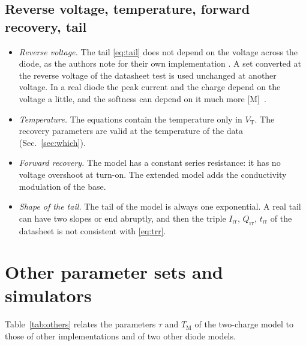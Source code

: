 \documentclass[10pt,a4paper]{scrartcl}
\newcommand{\Irr}{I_\mathrm{rr}}
\newcommand{\Qrr}{Q_\mathrm{rr}}
\newcommand{\trr}{t_\mathrm{rr}}
\newcommand{\TM}{T_\mathrm{M}}
\newcommand{\VT}{V_\mathrm{T}}
\begin{document}
\subsection{Reverse voltage, temperature, forward recovery, tail}
\label{sec:otherlimits}
\begin{itemize}
\item \emph{Reverse voltage.} The tail \eqref{eq:tail} does not depend on the voltage across the diode, as the authors note for their own implementation \cite{pemodels}. A set converted at the reverse voltage of the datasheet test is used unchanged at another voltage. In a real diode the peak current and the charge depend on the voltage a little, and the softness can depend on it much more [M]~\cite{lutz}.
\item \emph{Temperature.} The equations contain the temperature only in $\VT$. The recovery parameters are valid at the temperature of the data (Sec.~\ref{sec:which}).
\item \emph{Forward recovery.} The model has a constant series resistance: it has no voltage overshoot at turn-on. The extended model \cite{ma1993} adds the conductivity modulation of the base.
\item \emph{Shape of the tail.} The tail of the model is always one exponential. A real tail can have two slopes or end abruptly, and then the triple $\Irr$, $\Qrr$, $\trr$ of the datasheet is not consistent with \eqref{eq:trr}.
\end{itemize}

\section{Other parameter sets and simulators}
\label{sec:others}
Table~\ref{tab:others} relates the parameters $\tau$ and $\TM$ of the two-charge model to those of other implementations and of two other diode models.
\end{document}
